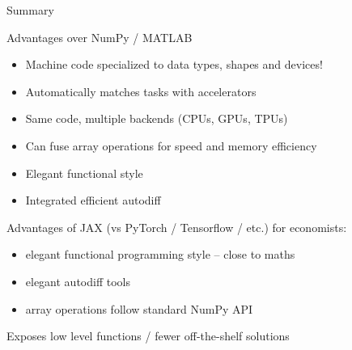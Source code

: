 \begin{frame}{Summary}
    
    Advantages over NumPy / MATLAB

    \vspace{0.5em}
    \begin{itemize}
        \item Machine code specialized to data types, shapes and devices!
        \vspace{0.5em}
        \vspace{0.5em}
        \item Automatically matches tasks with accelerators
        \vspace{0.5em}
        \vspace{0.5em}
        \item Same code, multiple backends (CPUs, GPUs, TPUs)
        \vspace{0.5em}
        \vspace{0.5em}
        \item Can fuse array operations for speed and memory efficiency
        \vspace{0.5em}
        \vspace{0.5em}
        \item Elegant functional style
        \vspace{0.5em}
        \vspace{0.5em}
        \item Integrated efficient autodiff
    \end{itemize}

\end{frame}

\begin{frame}

    Advantages of JAX (vs PyTorch / Tensorflow / etc.) for economists:
    \begin{itemize}
        \item elegant functional programming style -- close to maths
            \vspace{0.5em}
        \item elegant autodiff tools
            \vspace{0.5em}
        \item array operations follow standard NumPy API
    \end{itemize}

            \vspace{0.5em}
            \vspace{0.5em}

    Exposes low level functions / fewer off-the-shelf solutions

\end{frame}



